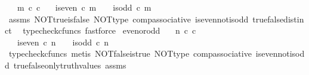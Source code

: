 \begin{isabellebody}
\ \ \ {\isachardoublequoteopen}m\ {\isasymin}\isactrlsub c\ {\isasymnat}\isactrlsub c{\isachardoublequoteclose}\isanewline
\ \ \ {\isachardoublequoteopen}{\isasymnot}{\isacharparenleft}{\kern0pt}is{\isacharunderscore}{\kern0pt}even\ {\isasymcirc}\isactrlsub c\ m\ {\isacharequal}{\kern0pt}\ {\isasymt}\ {\isasymand}\ is{\isacharunderscore}{\kern0pt}odd\ {\isasymcirc}\isactrlsub c\ m\ {\isacharequal}{\kern0pt}\ {\isasymt}{\isacharparenright}{\kern0pt}{\isachardoublequoteclose}\isanewline
%
\isadelimproof
\ \ %
\endisadelimproof
%
\isatagproof
{}\isamarkupfalse%
\ assms\ NOT{\isacharunderscore}{\kern0pt}true{\isacharunderscore}{\kern0pt}is{\isacharunderscore}{\kern0pt}false\ NOT{\isacharunderscore}{\kern0pt}type\ comp{\isacharunderscore}{\kern0pt}associative{}\ is{\isacharunderscore}{\kern0pt}even{\isacharunderscore}{\kern0pt}not{\isacharunderscore}{\kern0pt}is{\isacharunderscore}{\kern0pt}odd\ true{\isacharunderscore}{\kern0pt}false{\isacharunderscore}{\kern0pt}distinct\ \isamarkupfalse%
\ {\isacharparenleft}{\kern0pt}typecheck{\isacharunderscore}{\kern0pt}cfuncs{\isacharcomma}{\kern0pt}\ fastforce{\isacharparenright}{\kern0pt}%
\endisatagproof
{\isafoldproof}%
%
\isadelimproof
\isanewline
%
\endisadelimproof
\isanewline
{}\isamarkupfalse%
\ even{\isacharunderscore}{\kern0pt}or{\isacharunderscore}{\kern0pt}odd{\isacharcolon}{\kern0pt}\isanewline
\ \ \ {\isachardoublequoteopen}n\ {\isasymin}\isactrlsub c\ {\isasymnat}\isactrlsub c{\isachardoublequoteclose}\isanewline
\ \ \ {\isachardoublequoteopen}is{\isacharunderscore}{\kern0pt}even\ {\isasymcirc}\isactrlsub c\ n\ {\isacharequal}{\kern0pt}\ {\isasymt}\ {\isasymor}\ is{\isacharunderscore}{\kern0pt}odd\ {\isasymcirc}\isactrlsub c\ n\ {\isacharequal}{\kern0pt}\ {\isasymt}{\isachardoublequoteclose}\isanewline
%
\isadelimproof
\ \ %
\endisadelimproof
%
\isatagproof
{}\isamarkupfalse%
\ {\isacharparenleft}{\kern0pt}typecheck{\isacharunderscore}{\kern0pt}cfuncs{\isacharcomma}{\kern0pt}\ metis\ NOT{\isacharunderscore}{\kern0pt}false{\isacharunderscore}{\kern0pt}is{\isacharunderscore}{\kern0pt}true\ NOT{\isacharunderscore}{\kern0pt}type\ comp{\isacharunderscore}{\kern0pt}associative{}\ is{\isacharunderscore}{\kern0pt}even{\isacharunderscore}{\kern0pt}not{\isacharunderscore}{\kern0pt}is{\isacharunderscore}{\kern0pt}odd\ true{\isacharunderscore}{\kern0pt}false{\isacharunderscore}{\kern0pt}only{\isacharunderscore}{\kern0pt}truth{\isacharunderscore}{\kern0pt}values\ assms{\isacharparenright}{\kern0pt}%

\end{isabellebody}
